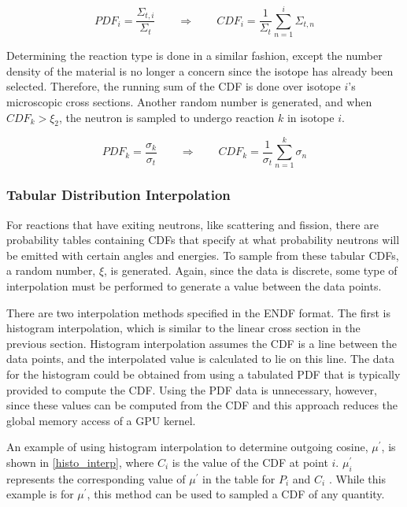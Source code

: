 \begin{equation}
\label{isotope_selection}
PDF_i = \frac{\Sigma_{t,i}}{\Sigma_t} \qquad \Rightarrow \qquad CDF_i = \frac{1}{\Sigma_t } \sum_{n=1}^i \Sigma_{t,n}
\end{equation}

Determining the reaction type is done in a similar fashion, except the number density of the material is no longer a concern since the isotope has already been selected.  Therefore, the running sum of the CDF is done over isotope $i$'s microscopic cross sections.  Another random number is generated, and when $CDF_k > \xi_2$, the neutron is sampled to undergo reaction $k$ in isotope $i$.

\begin{equation}
\label{reaction_selection}
PDF_k = \frac{\sigma_k}{\sigma_t} \qquad \Rightarrow \qquad CDF_k = \frac{1}{\sigma_{t} } \sum_{n=1}^k \sigma_{n}
\end{equation}


\subsubsection{Tabular Distribution Interpolation}

For reactions that have exiting neutrons, like scattering and fission, there are probability tables containing CDFs that specify at what probability neutrons will be emitted with certain angles and energies.  To sample from these tabular CDFs, a random number, $\xi$, is generated.  Again, since the data is discrete, some type of interpolation must be performed to generate a value between the data points.  

There are two interpolation methods specified in the ENDF format.  The first is histogram interpolation, which is similar to the linear cross section in the previous section.  Histogram interpolation assumes the CDF is a line between the data points, and the interpolated value is calculated to lie on this line.  The data for the histogram could be obtained from using a tabulated PDF that is typically provided to compute the CDF. Using the PDF data is unnecessary, however, since these values can be computed from the CDF and this approach reduces the global memory access of a GPU kernel. 

An example of using histogram interpolation to determine outgoing cosine, $\mu^\prime$, is shown in \eqref{histo_interp}, where $C_{i}$ is the value of the CDF at point $i$.  $\mu^\prime_i$ represents the corresponding value of $\mu^\prime$ in the table for $P_i$ and $C_i$ \cite{openmc}. %
  While this example is for $\mu^\prime$, this method can be used to sampled a CDF of any quantity.

